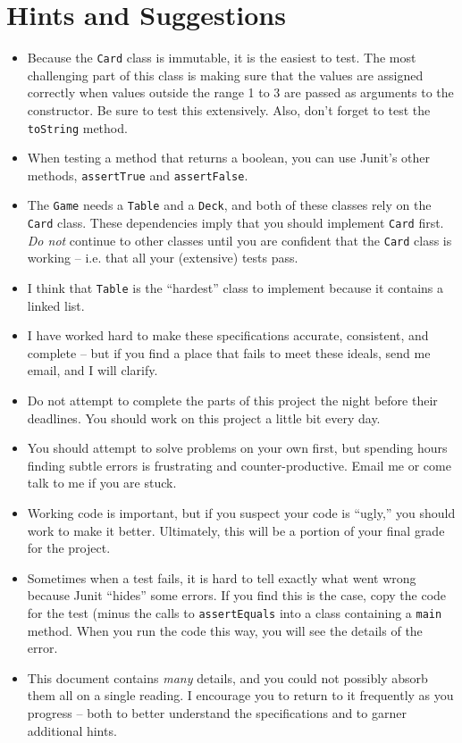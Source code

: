 \documentclass[11pt]{article}
\begin{document}
\section*{Hints and Suggestions}

\begin{itemize}
\item Because the {\tt Card} class is immutable, it is the easiest to test.
  The most challenging part of this class is making sure that the values are
  assigned correctly when values outside the range 1 to 3 are passed as
  arguments to the constructor.  Be sure to test this extensively.  Also, don't
  forget to test the {\tt toString} method.

\item When testing a method that returns a boolean, you can use Junit's other
  methods, {\tt assertTrue} and {\tt assertFalse}.

\item The {\tt Game} needs a {\tt Table} and a {\tt Deck}, and both of these
  classes rely on the {\tt Card} class.  These dependencies imply that you
  should implement {\tt Card} first.  {\em Do not} continue to other classes
  until you are confident that the {\tt Card} class is working -- i.e. that all
  your (extensive) tests pass.

\item I think that {\tt Table} is the ``hardest'' class to implement because it
  contains a linked list.

\item I have worked hard to make these specifications accurate, consistent, and
  complete -- but if you find a place that fails to meet these ideals, send me
  email, and I will clarify.

\item Do not attempt to complete the parts of this project the night before
  their deadlines.  You should work on this project a little bit every day.

\item You should attempt to solve problems on your own first, but spending
  hours finding subtle errors is frustrating and counter-productive.  Email me
  or come talk to me if you are stuck.

\item Working code is important, but if you suspect your code is ``ugly,'' you
  should work to make it better.  Ultimately, this will be a portion of your
  final grade for the project.

\item Sometimes when a test fails, it is hard to tell exactly what went wrong
  because Junit ``hides'' some errors.  If you find this is the case, copy the
  code for the test (minus the calls to {\tt assertEquals} into a class
  containing a {\tt main} method.  When you run the code this way, you will see
  the details of the error.

\item This document contains {\em many} details, and you could not possibly
  absorb them all on a single reading.  I encourage you to return to it
  frequently as you progress -- both to better understand the specifications
  and to garner additional hints.
\end{itemize}
\end{document}
